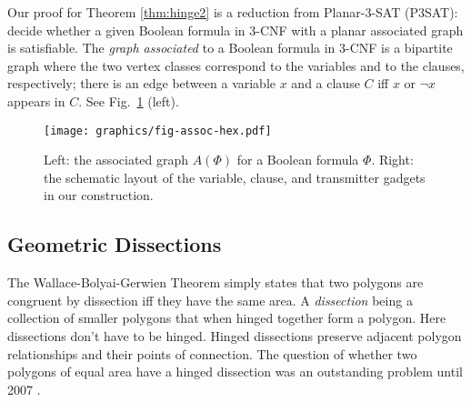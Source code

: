 Our proof for Theorem \ref{thm:hinge2} is a reduction from {\sc Planar-3-SAT} (P3SAT): decide whether a given Boolean formula in 3-CNF with a planar associated graph is satisfiable. The \emph{graph associated} to a Boolean formula in 3-CNF is a bipartite graph where the two vertex classes correspond to the variables and to the clauses, respectively; there is an edge between a variable $x$ and a clause $C$ iff $x$ or $\neg x$ appears in $C$. See Fig.~\ref{fig:assoc} (left).


\begin{figure}[!htbp]
	\centering
	\texttt{[image: graphics/fig-assoc-hex.pdf]}
	\caption[]{Left: the associated graph $A(\Phi)$ for a Boolean formula $\Phi$.
Right: the schematic layout of the variable, clause, and transmitter gadgets in our construction.}
	\label{fig:assoc}
\end{figure}





\subsection{Geometric Dissections}
The Wallace-Bolyai-Gerwien Theorem simply states that two polygons are congruent by dissection iff they have the same area.  A \textit{dissection} being a collection of smaller polygons that when hinged together form a polygon.  Here dissections don't have to be hinged.  Hinged dissections preserve adjacent polygon relationships and their points of connection.  The question of whether two polygons of equal area have a hinged dissection was an outstanding problem until 2007 \cite{abbott2012hinged}.

